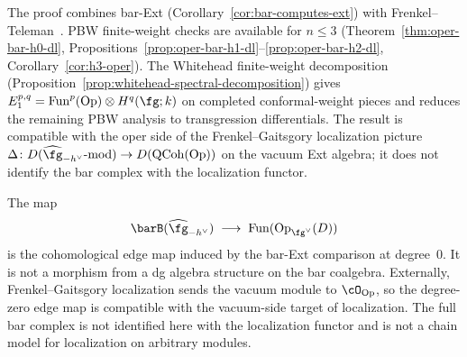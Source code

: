 \begin{remark}
\label{rem:oper-proof-structure}
The proof combines bar-Ext (Corollary~\ref{cor:bar-computes-ext})
with Frenkel--Teleman~\cite{FT06}. PBW finite-weight checks are
available for $n \leq 3$
(Theorem~\ref{thm:oper-bar-h0-dl},
Propositions~\ref{prop:oper-bar-h1-dl}--\ref{prop:oper-bar-h2-dl},
Corollary~\ref{cor:h3-oper}). The Whitehead finite-weight
decomposition
(Proposition~\ref{prop:whitehead-spectral-decomposition}) gives
$E_1^{p,q} = \mathrm{Fun}^p(\mathrm{Op}) \otimes H^q(\fg; k)$
on completed conformal-weight pieces and reduces the remaining PBW
analysis to transgression differentials. The result is compatible
with the oper side of the
Frenkel--Gaitsgory localization picture
$\Delta\colon D(\widehat{\fg}_{-h^\vee}\text{-}\mathrm{mod})
\to D(\mathrm{QCoh}(\mathrm{Op}))$
on the vacuum Ext algebra; it does not identify the bar complex with
the localization functor.
\end{remark}

\begin{remark}
The map
\[
\barB(\widehat{\fg}_{-h^\vee})
\;\longrightarrow\;
\mathrm{Fun}(\mathrm{Op}_{\fg^\vee}(D))
\]
is the cohomological edge map induced by the bar-Ext comparison at
degree~$0$. It is not a morphism from a dg algebra structure on the
bar coalgebra. Externally, Frenkel--Gaitsgory localization sends the
vacuum module to $\cO_{\mathrm{Op}}$, so the degree-zero edge map is
compatible with the vacuum-side target of localization. The full bar
complex is not identified here with the localization functor and is
not a chain model for localization on arbitrary modules.
\end{remark}

